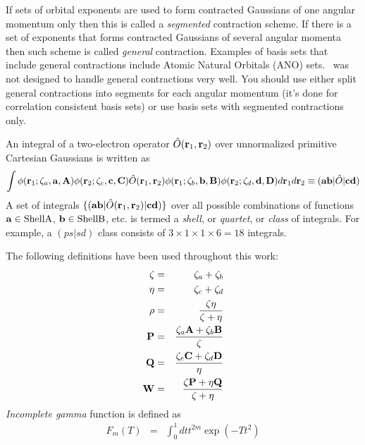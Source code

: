 \documentclass[12pt]{article}
\begin{document}
If sets of orbital exponents are used to form contracted Gaussians of one angular momentum only
then this is called a {\em segmented} contraction scheme. If there is a set of exponents that forms
contracted Gaussians of several angular momenta then such scheme is called {\em general} contraction.
Examples of basis sets that include general contractions include Atomic Natural Orbitals (ANO) sets.
\LIBINT\ was not designed to handle general contractions very well. You should use either split general contractions
into segments for each angular momentum (it's done for correlation consistent basis sets)
or use basis sets with segmented contractions only.

An integral of a two-electron operator $\hat{O}({\bf r}_1, {\bf r}_2)$ over unnormalized
primitive Cartesian Gaussians is written as
\begin{eqnarray}
\int \phi({\bf r}_1; \zeta_a, {\bf a}, {\bf A}) \phi ({\bf r}_2; \zeta_c, {\bf c}, {\bf C}) \hat{O}({\bf r}_1, {\bf r}_2)
\phi({\bf r}_1; \zeta_b, {\bf b}, {\bf B}) \phi({\bf r}_2; \zeta_d, {\bf d}, {\bf D}) d{\bf r}_1 d{\bf r}_2 \equiv ({\bf ab} |\hat{O}|{\bf cd})
\end{eqnarray}
A set of integrals $\{ ({\bf a} {\bf b}|\hat{O}({\bf r}_1, {\bf r}_2)|{\bf c} {\bf d}) \}$
over all possible combinations of functions ${\bf a} \in {\rm Shell A}$, ${\bf b} \in {\rm Shell B}$, etc.
is termed a {\em shell}, or {\em quartet}, or {\em class} of integrals. For example, a $(ps|sd)$ class consists of
$3 \times 1 \times 1 \times 6 = 18$ integrals.

The following definitions have been used throughout this work:
\begin{eqnarray}
\zeta & = & \zeta_a + \zeta_b \\
\eta  & = & \zeta_c + \zeta_d \\
\rho  & = & \frac{\zeta\eta}{\zeta+\eta} \\
{\bf P}& = & \frac{\zeta_a {\bf A} + \zeta_b {\bf B}}{\zeta} \\
{\bf Q}& = & \frac{\zeta_c {\bf C} + \zeta_d {\bf D}}{\eta} \\
{\bf W}& = & \frac{\zeta {\bf P} + \eta {\bf Q}}{\zeta+\eta}
\end{eqnarray}
{\em Incomplete gamma} function is defined as
\begin{eqnarray}
F_m(T) & = & \int_0^{1} dt t^{2m} \exp (-Tt^2)
\end{eqnarray}
\end{document}

